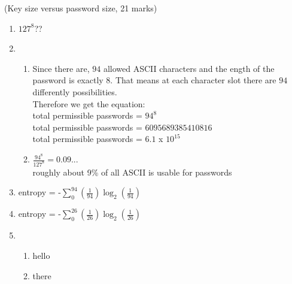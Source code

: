 \documentclass{assignment}
\begin{document}
\begin{problemlist}
\clearpage

\pbitem (Key size versus password size, 21 marks)
\begin{problem}
\begin{answer}
\begin{enumerate}[label=(\alph*)]
	\item	$127^8$??
	\item 	\begin{enumerate}[label=(\roman*)]
			\item Since there are, $94$ allowed ASCII characters and the ength of the password is exactly $8$. That means at each character slot there are $94$ differently possibilities.\\
			Therefore we get the equation:\\
				total permissible passwords = $94^8$ \\
				total permissible passwords = $6095689385410816$ \\
				total permissible passwords = $6.1$ x $10^{15}$ \\
			
			\item $\frac{94^8}{127^8} = 0.09... $ \\
				  roughly about 9\% of all ASCII is usable for passwords
			\end{enumerate}
	\item entropy = -$\sum_{0}^{94} (\frac{1}{94})  \log_2(\frac{1}{94})$ 
	\item entropy = -$\sum_{0}^{26} (\frac{1}{26})  \log_2(\frac{1}{26})$
	\item 	\begin{enumerate}[label=(\roman*)]
			\item hello
			\item there
			\end{enumerate}
\end{enumerate}
\end{answer}
\end{problem}

\end{problemlist}
\end{document}
